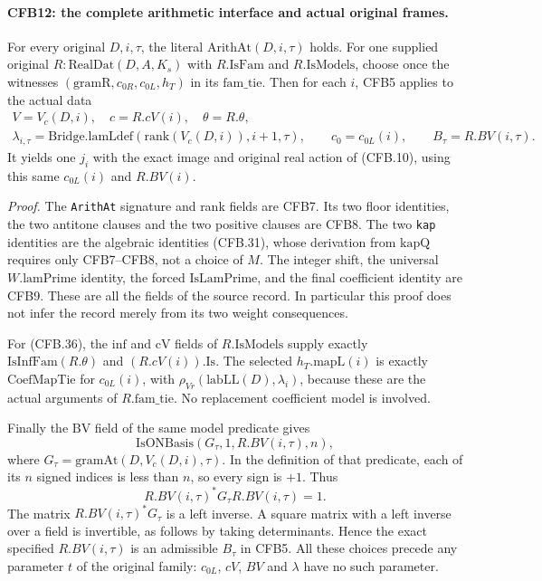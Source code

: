 \paragraph{CFB12: the complete arithmetic interface and actual original frames.}
\label{claim:CFB12}
For every original \(D,i,\tau\), the literal
\(\mathrm{ArithAt}(D,i,\tau)\) holds.
For one supplied original \(R:\mathrm{RealDat}(D,A,K_s)\) with
\(R.\mathrm{IsFam}\) and \(R.\mathrm{IsModels}\), choose once
the witnesses \((\mathrm{gramR},c_{0R},c_{0L},h_T)\) in its
\(\mathrm{fam\_tie}\).  Then for each \(i\), CFB5 applies to
the actual data
\[
 \begin{gathered}
 V=V_c(D,i),\quad c=R.cV(i),\quad \theta=R.\theta,\\
 \lambda_{i,\tau}=\mathrm{Bridge.lamLdef}(\mathrm{rank}(V_c(D,i)),i+1,\tau),
 \qquad c_0=c_{0L}(i),\qquad B_\tau=R.BV(i,\tau).
 \end{gathered}                                                 \tag{CFB.36}
\]
It yields one \(j_i\) with the exact image and original real action
of (CFB.10), using this same \(c_{0L}(i)\) and \(R.BV(i)\).

\emph{Proof.}
The \texttt{ArithAt} signature and rank fields are CFB7.
Its two floor identities, the two antitone clauses and the two
positive clauses are CFB8.  The two \texttt{kap} identities are
the algebraic identities (CFB.31), whose derivation from
\(\mathrm{kapQ}\) requires only CFB7--CFB8, not a choice of \(M\).
The integer shift, the universal \(W.\mathrm{lamPrime}\) identity,
the forced \(\mathrm{IsLamPrime}\), and the final coefficient
identity are CFB9.  These are all the fields of the source record.
In particular this proof does not infer the record merely from
its two weight consequences.

For (CFB.36), the \(\mathrm{inf}\) and \(\mathrm{cV}\) fields
of \(R.\mathrm{IsModels}\) supply exactly
\(\mathrm{IsInfFam}(R.\theta)\) and \((R.cV(i)).\mathrm{Is}\).
The selected \(h_T.\mathrm{mapL}(i)\) is exactly
\(\mathrm{CoefMapTie}\) for \(c_{0L}(i)\), with
\(\rho_{Vr}(\mathrm{labLL}(D),\lambda_i)\), because these
are the actual arguments of \(R.\mathrm{fam\_tie}\).
No replacement coefficient model is involved.

Finally the \(\mathrm{BV}\) field of the same model predicate gives
\[
           \mathrm{IsONBasis}(G_\tau,1,R.BV(i,\tau),n),
\]
where
\(G_\tau=\mathrm{gramAt}(D,V_c(D,i),\tau)\).
In the definition of that predicate, each of its \(n\) signed
indices is less than \(n\), so every sign is \(+1\).  Thus
\[
                R.BV(i,\tau)^*G_\tau R.BV(i,\tau)=1.           \tag{CFB.37}
\]
The matrix \(R.BV(i,\tau)^*G_\tau\) is a left inverse.
A square matrix with a left inverse over a field is invertible,
as follows by taking determinants.  Hence the exact specified
\(R.BV(i,\tau)\) is an admissible \(B_\tau\) in CFB5.
All these choices precede any parameter \(t\) of the original
family: \(c_{0L}\), \(cV\), \(BV\) and \(\lambda\) have no
such parameter.


